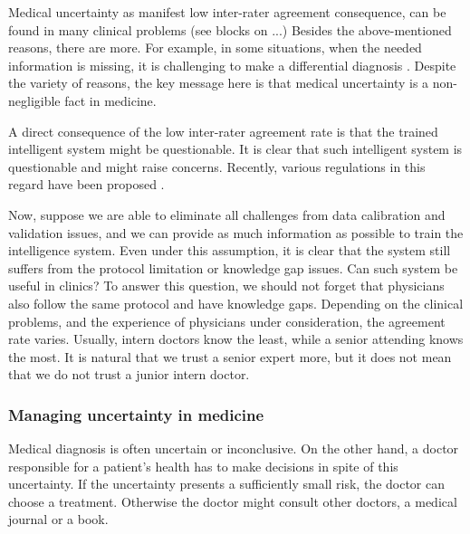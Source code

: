 \documentclass[11pt]{pnas-new}
\begin{document}
\newpage
  Medical uncertainty as manifest low inter-rater agreement
  consequence, can be found in many clinical problems (see blocks on
  ...) {\color{blue}Besides the above-mentioned reasons, there are more. For example,} in some situations, when the needed
  information is missing, it is challenging to make a differential
  diagnosis \cite{moncada2011reading}. 
  {\color{blue}Despite the variety of reasons, the key message here is that medical uncertainty is a non-negligible fact in medicine.} 

  A direct consequence of the low inter-rater agreement rate is that the trained intelligent system might be questionable. 
%  
It is clear that such intelligent system is questionable and might raise concerns. Recently, various regulations in this regard have been proposed \cite{price2014black,ford2016privacy}.


Now, suppose we are able to eliminate all challenges from data
calibration and validation issues, and we can provide as much
information as possible to train the intelligence system. Even under
this assumption, it is clear that the system still suffers from the
protocol limitation or knowledge gap issues. Can such system be useful
in clinics? To answer this question, we should not forget that
physicians also follow the same protocol and have knowledge
gaps. Depending on the clinical problems, and the experience of
physicians under consideration, the agreement rate varies. Usually,
intern doctors know the least, while a senior attending knows the
most. It is natural that we trust a senior expert more, but it does
not mean that we do not trust a junior intern doctor.

\subsubsection*{Managing uncertainty in medicine}
Medical diagnosis is often uncertain or inconclusive. On the other
hand, a doctor responsible for a patient's health has to make
decisions in spite of this uncertainty. If the uncertainty presents a
sufficiently small risk, the doctor can choose a treatment. Otherwise
the doctor might consult other doctors, a medical journal or a book. 
\end{document}
